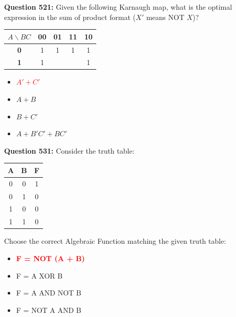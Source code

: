 \documentclass[12pt,a4paper]{article}
\begin{document}
\textbf{Question 521:} Given the following Karnaugh map, what is the optimal expression in the sum of product format ($X'$ means NOT $X$)?

\begin{center}
\renewcommand{\arraystretch}{1.4}
\begin{tabular}{|c|c|c|c|c|}
\hline
$A \backslash BC$ & \textbf{00} & \textbf{01} & \textbf{11} & \textbf{10} \\ \hline
\textbf{0} & 1 & 1 & 1 & 1 \\ \hline
\textbf{1} & 1 & & & 1 \\ \hline
\end{tabular}
\end{center}

\begin{itemize}
    \item[\textbf{A.}] \textcolor{red}{\textbf{$A' + C'$}}
    \item[\textbf{B.}] $A + B$
    \item[\textbf{C.}] $B + C'$
    \item[\textbf{D.}] $A + B'C' + BC'$
\end{itemize}

\vspace{0.5cm}

\textbf{Question 531:} Consider the truth table:

\begin{center}
\renewcommand{\arraystretch}{1.3}
\begin{tabular}{|c|c|c|}
\hline
\textbf{A} & \textbf{B} & \textbf{F} \\ \hline
0 & 0 & 1 \\ \hline
0 & 1 & 0 \\ \hline
1 & 0 & 0 \\ \hline
1 & 1 & 0 \\ \hline
\end{tabular}
\end{center}

Choose the correct Algebraic Function matching the given truth table:

\begin{itemize}
    \item[\textbf{A.}] \textcolor{red}{\textbf{F = NOT (A + B)}}
    \item[\textbf{B.}] F = A XOR B
    \item[\textbf{C.}] F = A AND NOT B
    \item[\textbf{D.}] F = NOT A AND B
\end{itemize}
\end{document}
